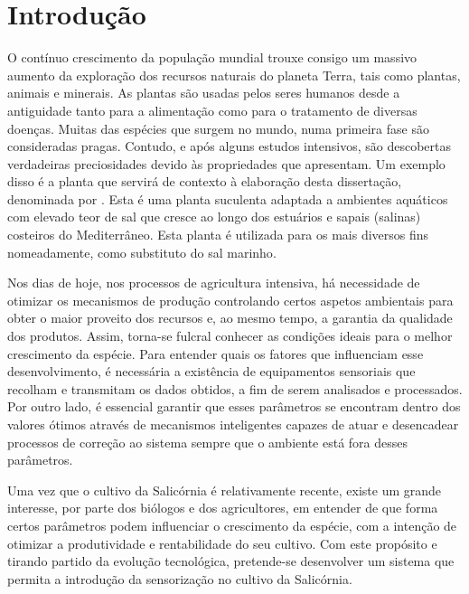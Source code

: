 \chapter{Introdução}

O contínuo crescimento da população mundial trouxe consigo um massivo aumento da exploração dos recursos naturais do planeta Terra, tais como plantas, animais e minerais. As plantas são usadas pelos seres humanos desde a antiguidade tanto para a alimentação como para o tratamento de diversas doenças. Muitas das espécies que surgem no mundo, numa primeira fase são consideradas pragas. Contudo, e após alguns estudos intensivos, são descobertas verdadeiras preciosidades devido às propriedades que apresentam\cite{Verma2008}\cite{Newman2012}. Um exemplo disso é a planta que servirá de contexto à elaboração desta dissertação, denominada por \sr. Esta é uma planta suculenta adaptada a ambientes aquáticos com elevado teor de sal que cresce ao longo dos estuários e sapais (salinas) costeiros do Mediterrâneo\cite{Ventura2011}. Esta planta é utilizada para os mais diversos fins nomeadamente, como substituto do sal marinho\cite{jnsalic}. 





Nos dias de hoje, nos processos de agricultura intensiva, há necessidade de otimizar os mecanismos de produção controlando certos aspetos ambientais para obter o maior proveito dos recursos e, ao mesmo tempo, a garantia da qualidade dos produtos. Assim, torna-se fulcral conhecer as condições ideais para o melhor crescimento da espécie. Para entender quais os fatores que influenciam esse desenvolvimento, é necessária a existência de equipamentos sensoriais que recolham e transmitam os dados obtidos, a fim de serem analisados e processados. Por outro lado, é essencial garantir que esses parâmetros se encontram dentro dos valores ótimos através de mecanismos inteligentes capazes de atuar e desencadear processos de correção ao sistema sempre que o ambiente está fora desses parâmetros. 


Uma vez que o cultivo da Salicórnia é relativamente recente, existe um grande interesse, por parte dos biólogos e dos agricultores, em entender de que forma certos parâmetros podem influenciar o crescimento da espécie, com a intenção de otimizar a produtividade e rentabilidade do seu cultivo. Com este propósito e tirando partido da evolução tecnológica, pretende-se desenvolver um sistema que permita a introdução da sensorização no cultivo da Salicórnia.     


